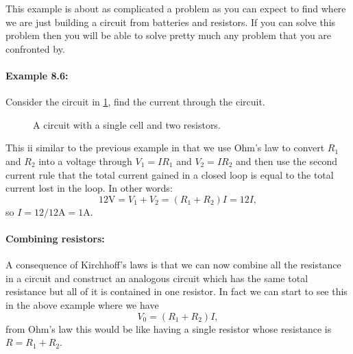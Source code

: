 \documentclass[a4paper,12pt]{book}
\begin{document}
This example is about as complicated a problem as you can expect to find where we are just building a circuit from batteries and resistors. If you can solve this problem then you will be able to solve pretty much any problem that you are confronted by.

\paragraph{Example 8.6:} Consider the circuit in \cref{fig: 2 resistors}, find the current through the circuit.\\

  \begin{figure}[ht]
    \centering
    \caption{A circuit with a single cell and two resistors.}
    \label{fig: 2 resistors}
\end{figure}

This ii similar to the previous example in that we use Ohm's law to convert $R_{1}$ and $R_{2}$ into a voltage through $V_{1}=I R_{1}$ and $V_{2}=I R_{2}$ and then use the second current rule that the total current gained in a closed loop is equal to the total current lost in the loop. In other words:
\begin{equation*}
12\text{V}=V_{1}+V_{2}=\left(R_{1}+R_{2}\right)I=12I,
\end{equation*}
so $I=12/12 \text{A}=1\text{A}$.


\paragraph{Combining resistors:} A consequence of Kirchhoff's laws is that we can now combine all the resistance in a circuit and construct an analogous circuit which has the same total resistance but all of it is contained in one resistor. In fact we can start to see this in the above example where we have 
\begin{equation*}
V_{0}=\left(R_{1}+R_{2}\right)I,
\end{equation*}
from Ohm's law this would be like having a single resistor whose resistance is $R=R_{1}+R_{2}$. \\
\end{document}
